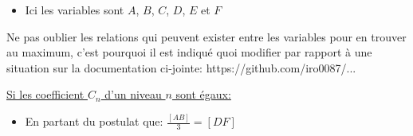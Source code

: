 \documentclass[10pt]{article}
\begin{document}
\vspace{.5cm}

\begin{itemize}

        \item Ici les variables sont $A$, $B$, $C$, $D$, $E$ et $F$

\end{itemize}

\color{red}\danger\color{black}Ne pas oublier les relations qui peuvent exister entre les variables pour en trouver au maximum, c'est pourquoi il est indiqué quoi modifier par rapport à une situation sur la documentation ci-jointe: https://github.com/iro0087/...

\newpage

\uline{Si les coefficient $C_{n}$ d'un niveau $n$ sont égaux:}

\vspace{-3cm}

\begin{itemize}

        \item En partant du postulat que: $\frac{[AB]}{3} = [DF]$

\end{itemize}
\end{document}
